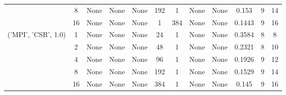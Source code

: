 \begin{tabular}{cccccccccccc}
& 8& None& None& None& 192& 1& None& None& 0.153& 9& 14\\
& 16& None& None& None& 1& 384& None& None& 0.1443& 9& 16\\
\hline
\multirow{5}{*}{('MPI', 'CSR', 1.0)}& 1& None& None& None& 24& 1& None& None& 0.3584& 8& 8\\
& 2& None& None& None& 48& 1& None& None& 0.2321& 8& 10\\
& 4& None& None& None& 96& 1& None& None& 0.1926& 9& 12\\
& 8& None& None& None& 192& 1& None& None& 0.1529& 9& 14\\
& 16& None& None& None& 384& 1& None& None& 0.145& 9& 16\\
\hline
\end{tabular}



